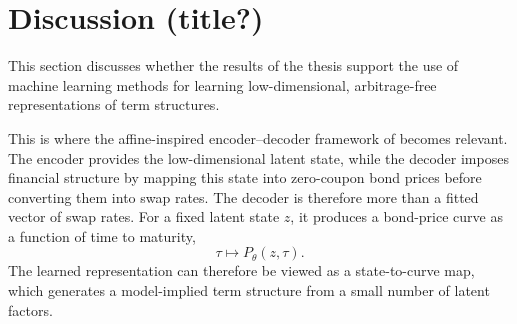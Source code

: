 \chapter{Discussion (title?)}
\label{ch:discussion}






This section discusses whether the results of the thesis support the use of machine learning methods for learning low-dimensional, arbitrage-free representations of term structures.

This is where the affine-inspired encoder--decoder framework of \citet{MatinWanPoulsen2025} becomes relevant. The encoder provides the low-dimensional latent state, while the decoder imposes financial structure by mapping this state into zero-coupon bond prices before converting them into swap rates. The decoder is therefore more than a fitted vector of swap rates. For a fixed latent state \(z\), it produces a bond-price curve as a function of time to maturity,
\[
    \tau \mapsto P_\theta(z,\tau).
\]
The learned representation can therefore be viewed as a state-to-curve map, which generates a model-implied term structure from a small number of latent factors.

